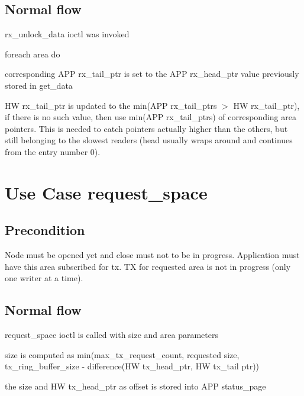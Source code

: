   \subsection{Normal flow}
  \begin{CompactEnumerate}
    \item rx\_unlock\_data ioctl was invoked
    \item foreach area do
    \begin{CompactEnumerate}
      \item corresponding APP rx\_tail\_ptr is set to the APP rx\_head\_ptr
        value previously stored in get\_data
      \item HW rx\_tail\_ptr is updated to the min(APP rx\_tail\_ptrs $>$ HW
        rx\_tail\_ptr), if there is no such value, then use min(APP
	rx\_tail\_ptrs) of corresponding area pointers. This is needed to
	catch pointers actually higher than the others, but still belonging to
	the slowest readers (head usually wraps around and continues from the
	entry number 0).
    \end{CompactEnumerate}
  \end{CompactEnumerate}

  \section{Use Case request\_space}

  \subsection{Precondition}
  Node must be opened yet and close must not to be in progress.
  Application must have this area subscribed for tx.
  TX for requested area is not in progress (only one writer at a time).

  \subsection{Normal flow}
  \begin{CompactEnumerate}
    \item request\_space ioctl is called with size and area parameters
    \item size is computed as min(max\_tx\_request\_count, requested size,
      tx\_ring\_buffer\_size - difference(HW tx\_head\_ptr, HW tx\_tail ptr))
    \item the size and HW tx\_head\_ptr as offset is stored into APP
      status\_page
  \end{CompactEnumerate}

